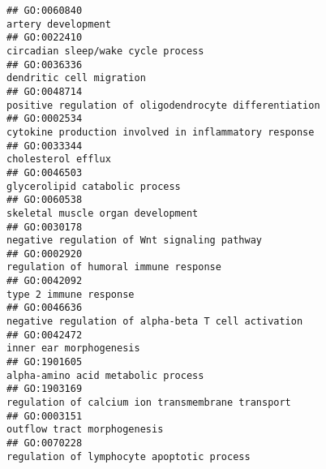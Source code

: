 \documentclass[
]{article}
\begin{document}
\begin{verbatim}
## GO:0060840                                                                                                                               artery development
## GO:0022410                                                                                                               circadian sleep/wake cycle process
## GO:0036336                                                                                                                         dendritic cell migration
## GO:0048714                                                                                           positive regulation of oligodendrocyte differentiation
## GO:0002534                                                                                            cytokine production involved in inflammatory response
## GO:0033344                                                                                                                               cholesterol efflux
## GO:0046503                                                                                                                   glycerolipid catabolic process
## GO:0060538                                                                                                                skeletal muscle organ development
## GO:0030178                                                                                                     negative regulation of Wnt signaling pathway
## GO:0002920                                                                                                            regulation of humoral immune response
## GO:0042092                                                                                                                           type 2 immune response
## GO:0046636                                                                                              negative regulation of alpha-beta T cell activation
## GO:0042472                                                                                                                          inner ear morphogenesis
## GO:1901605                                                                                                               alpha-amino acid metabolic process
## GO:1903169                                                                                                regulation of calcium ion transmembrane transport
## GO:0003151                                                                                                                      outflow tract morphogenesis
## GO:0070228                                                                                                       regulation of lymphocyte apoptotic process

\end{verbatim}
\end{document}
